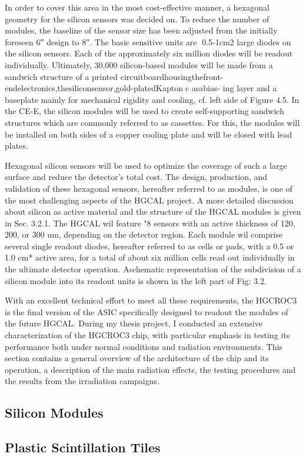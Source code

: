 In order to cover this area in the most cost-effective manner, a hexagonal geometry for the silicon sensors was decided on. To reduce the number of modules, the baseline of the sensor size has been adjusted from the initially foreseen 6′′ design to 8′′. The basic sensitive units are ∼0.5-1cm2 large diodes on the silicon sensors. Each of the approximately six million diodes will be readout individually.
Ultimately, 30,000 silicon-based modules will be made from a sandwich structure of a printed circuitboardhousingthefront-endelectronics,thesiliconsensor,gold-platedKapton⃝c asabias- ing layer and a baseplate mainly for mechanical rigidity and cooling, cf. left side of Figure 4.5. In the CE-E, the silicon modules will be used to create self-supporting sandwich structures which are commonly referred to as cassettes. For this, the modules will be installed on both sides of a copper cooling plate and will be closed with lead plates.

Hexagonal silicon sensors will be used to optimize the coverage of such a large surface and reduce the detector's total cost. The design, production, and validation of these hexagonal sensors, hereafter referred to as modules, is one of the most challenging aspects of the HGCAL project. A more detailed discussion about silicon as active material and the structure of the HGCAL modules is given in Sec. 3.2.1. The HGCAL wil feature "8 sensors with an active thickness of 120, 200, or 300 um, depending on the detector region. Each
module wil comprise several single readout diodes, hereafter referred to as cells or pads, with a 0.5 or 1.0 cm* active area, for a total of about six million cells read out individually in the ultimate detector operation. Aschematic representation of the subdivision of a silicon module into its readout units is shown in the left part of Fig: 3.2.




With an excellent technical effort to meet all these requirements, the HGCROC3 is the final version of the ASIC specifically designed to readout the modules of the future HGCAL. 
During my thesis project, I conducted an extensive characterization of the HGCROC3 chip, with particular emphasis in testing its performance both under normal conditions and radiation environments.
This section contains a general overview of the architecture of the chip and its operation, a description of the main radiation effects, the testing procedures and the results from the irradiation campaigns.

\subsection{Silicon Modules}

\subsection{Plastic Scintillation Tiles}